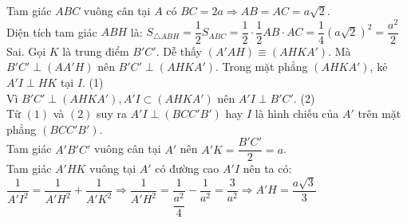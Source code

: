 \begin{ex}
{\begin{itemchoice}
   Tam giác $A B C$ vuông cân  tại $A$ có $B C=2 a \Rightarrow A B=A C=a \sqrt{2}$.\\
   Diện tích tam  giác $A B H$ là:
   $S_{\triangle A B H}=\dfrac{1}{2} S_{A B C}=\dfrac{1}{2} \cdot \dfrac{1}{2}  A B \cdot A C=\dfrac{1}{4}(a \sqrt{2})^2=\dfrac{a^2}{2}$
   \itemch Sai. Gọi $K$ là trung điểm $B' C'$. Dễ thấy $\left(A' A H\right) \equiv\left(A H K  A'\right)$.
   Mà $B' C' \perp\left(A  A' H\right)$ nên $B' C' \perp\left(A H K A'\right)$.
   Trong  mặt phẳng $\left(A H K A'\right)$, kẻ $A' I \perp H K$ tại $I$. (1)\\
   Vì $B' C' \perp\left(A H K A'\right), A' I \subset\left(A H K  A'\right)$ nên $A' I \perp B' C'$. (2)\\
   Từ $(1)$ và $(2)$ suy ra $A' I \perp\left(B C C' B'\right)$ hay $I$ là hình  chiếu của $A'$ trên mặt phẳng $\left(B C C' B'\right)$.\\
   Tam giác $A' B' C'$ vuông cân tại  $A'$ nên $A' K=\dfrac{B' C'}{2}=a$.\\
   Tam giác $A' H K$ vuông tại $A'$ có đường cao  $A' I$ nên ta có:\\
   $\dfrac{1}{A' I^2}=\dfrac{1}{A' H^2}+\dfrac{1}{A' K^2} \Rightarrow \dfrac{1}{A' H^2}=\dfrac{1}{\dfrac{a^2}{4}}-\dfrac{1}{a^2}=\dfrac{3}{a^2} \Rightarrow A' H=\dfrac{a \sqrt{3}}{3}$ 
  \end{itemchoice}
 } 
\end{ex}



